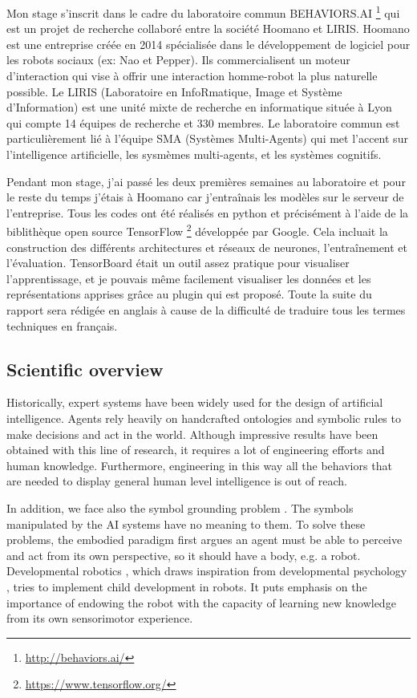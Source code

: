 Mon stage s'inscrit dans le cadre du laboratoire commun BEHAVIORS.AI%
\footnote{\href{http://behaviors.ai/}{http://behaviors.ai/}}
qui est un projet de recherche collaboré entre la société Hoomano et LIRIS.
Hoomano est une entreprise créée en 2014 spécialisée dans le développement
de logiciel pour les robots sociaux (ex: Nao et Pepper).
Ils commercialisent un moteur d'interaction qui
vise à offrir une interaction homme-robot la plus naturelle possible.
Le LIRIS (Laboratoire en InfoRmatique, Image et Système d'Information)
est une unité mixte de recherche en informatique située à Lyon qui compte
14 équipes de recherche et 330 membres. Le laboratoire commun est
particulièrement lié à l'équipe SMA (Systèmes Multi-Agents) qui
met l'accent sur l'intelligence artificielle, les sysmèmes multi-agents,
et les systèmes cognitifs.

Pendant mon stage, j'ai passé les deux premières semaines au
laboratoire et pour le reste du temps j'étais à Hoomano car j'entraînais
les modèles sur le serveur de l'entreprise. Tous les codes ont été
réalisés en python et précisément à l'aide de la biblithèque open source
TensorFlow%
\footnote{\href{https://www.tensorflow.org/}{https://www.tensorflow.org/}}
développée par Google. Cela incluait la construction des
différents architectures et réseaux de neurones, l'entraînement et
l'évaluation.
TensorBoard était un outil assez pratique pour visualiser l'apprentissage,
et je pouvais même facilement visualiser les données et les
représentations apprises grâce au plugin qui est proposé.
Toute la suite du rapport sera rédigée en anglais à cause de la difficulté
de traduire tous les termes techniques en français.

\subsection{Scientific overview}

Historically, expert systems have been widely used for the design
of artificial intelligence. 
Agents rely heavily on handcrafted ontologies and symbolic rules to
make decisions and act in the world.
Although impressive results have been obtained with this line of
research, it requires a lot of engineering efforts and human knowledge.
Furthermore, engineering in this way all the behaviors that are needed
to display general human level intelligence is out of reach.

In addition, we face also the symbol grounding problem
\cite{S. Harnad 1990}. The symbols manipulated by the AI systems have
no meaning to them. To solve these problems, the embodied paradigm
\cite{A. Clark 1997} first argues an agent must be able to perceive and
act from its own perspective, so it should have a body, e.g. a robot.
Developmental robotics \cite{J. Weng 2001}, which draws inspiration
from developmental psychology \cite{J. Piaget 1952}, tries to implement
child development  in robots. It puts emphasis on the
importance of endowing the robot with the capacity of learning new
knowledge from its own sensorimotor experience.

